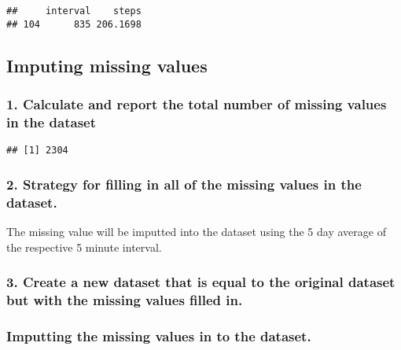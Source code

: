 \documentclass[]{article}
\newenvironment{Shaded}{\begin{snugshade}}{\end{snugshade}}
\newcommand{\KeywordTok}[1]{\textcolor[rgb]{0.13,0.29,0.53}{\textbf{#1}}}
\newcommand{\StringTok}[1]{\textcolor[rgb]{0.31,0.60,0.02}{#1}}
\newcommand{\OperatorTok}[1]{\textcolor[rgb]{0.81,0.36,0.00}{\textbf{#1}}}
\newcommand{\NormalTok}[1]{#1}
\begin{document}
\begin{verbatim}
##     interval    steps
## 104      835 206.1698
\end{verbatim}

\subsection{Imputing missing values}\label{imputing-missing-values}

\subsubsection{1. Calculate and report the total number of missing
values in the
dataset}\label{calculate-and-report-the-total-number-of-missing-values-in-the-dataset}

\begin{Shaded}
\end{Shaded}

\begin{verbatim}
## [1] 2304
\end{verbatim}

\subsubsection{2. Strategy for filling in all of the missing values in
the
dataset.}\label{strategy-for-filling-in-all-of-the-missing-values-in-the-dataset.}

The missing value will be imputted into the dataset using the 5 day
average of the respective 5 minute interval.

\subsubsection{3. Create a new dataset that is equal to the original
dataset but with the missing values filled
in.}\label{create-a-new-dataset-that-is-equal-to-the-original-dataset-but-with-the-missing-values-filled-in.}

\subsubsection{Imputting the missing values in to the
dataset.}\label{imputting-the-missing-values-in-to-the-dataset.}
\end{document}
